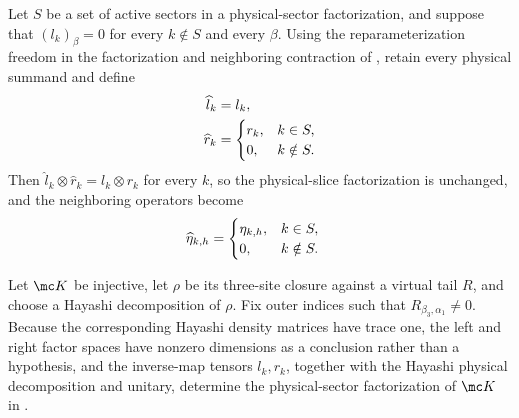 \begin{definition}
    \label{def:mpdo_physical_sector_inactive_right_zero}
    \leanok
    Let $S$ be a set of active sectors in a physical-sector factorization,
    and suppose that $(l_k)_\beta=0$ for every $k\notin S$ and every $\beta$.
    Using the reparameterization freedom in the factorization and neighboring
    contraction of \cite[Appendix~C.2, lines~1434--1445]{Cirac2016MPDO_arXiv},
    retain every physical summand and define
    \begin{align}
        \widehat l_k & =l_k,
        \notag               \\
        \widehat r_k & =
        \begin{cases}
            r_k, & k\in S,    \\
            0,   & k\notin S.
        \end{cases}
        \notag
    \end{align}
    Then $\widehat l_k\otimes\widehat r_k=l_k\otimes r_k$ for every $k$,
    so the physical-slice factorization is unchanged, and the neighboring
    operators become
    \begin{align}
        \widehat\eta_{k,h}
         & =
        \begin{cases}
            \eta_{k,h}, & k\in S,    \\
            0,          & k\notin S.
        \end{cases}
        \notag
    \end{align}
\end{definition}

\begin{definition}
    \label{def:mpdo_inverse_map_physical_sector_factorization}
    \leanok
    Let $\mc K$ be injective, let $\rho$ be its three-site closure against
    a virtual tail $R$, and choose a Hayashi decomposition of $\rho$. Fix
    outer indices such that $R_{\beta_3,\alpha_1}\ne0$. Because the
    corresponding Hayashi density matrices have trace one, the left and right
    factor spaces have nonzero dimensions as a conclusion rather than a
    hypothesis, and the inverse-map tensors $l_k,r_k$, together with the
    Hayashi physical decomposition and unitary, determine the physical-sector
    factorization of $\mc K$ in
    \cite[Appendix~C.2, equations \texttt{AppUkU=rl} and \texttt{formK},
        lines~1383--1387 and~1434--1439]{Cirac2016MPDO_arXiv}.
\end{definition}

